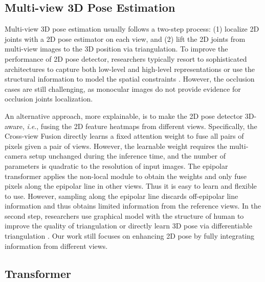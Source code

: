 \documentclass{bmvc2k}
\newcommand{\ie}{\textit{i}.\textit{e}., }
\begin{document}
\subsection{Multi-view 3D Pose Estimation}
\vspace{-0.6em}
Multi-view 3D pose estimation usually follows a two-step process: (1) localize 2D joints with a 2D pose estimator on each view, and (2) lift the 2D joints from multi-view images to the 3D position via triangulation. 
To improve the performance of 2D pose detector, researchers typically resort to sophisticated architectures to capture both low-level and high-level representations  \cite{wei2016convolutional, chen2018cascaded, newell2016stacked, xiao2018simple, sun2019deep} or use the structural information to model the spatial constraints \cite{tompson2014joint, kong2019adaptive, kong2020rotation, kong2020sia, chen2020nonparametric}. However, the occlusion cases are still challenging, as monocular images do not provide evidence for occlusion joints localization. 


An alternative approach, more explainable, is to make the 2D pose detector 3D-aware, \ie fusing the 2D feature heatmaps \cite{qiu2019cross, zhang2021adafuse, xie2020metafuse, chen2021mvhm, he2020epipolar} from different views. 
Specifically, the Cross-view Fusion \cite{qiu2019cross} directly learns a fixed attention weight to fuse all pairs of pixels given a pair of views. However, the learnable weight requires the multi-camera setup unchanged during the inference time, and the number of parameters is quadratic to the resolution of input images. 
The epipolar transformer \cite{he2020epipolar} applies the non-local module \cite{wang2018non} to obtain the weights and only fuse pixels along the epipolar line in other views. Thus it is easy to learn and flexible to use. 
However, sampling along the epipolar line discards off-epipolar line information and thus obtains limited information from the reference views.
In the second step, researchers use graphical model with the structure of human \cite{qiu2019cross} to improve the quality of triangulation or directly learn 3D pose via differentiable triangulation \cite{iskakov2019learnable}. 
Our work still focuses on enhancing 2D pose by fully integrating information from different views. 


\vspace{-1.0em}
\subsection{Transformer}
\vspace{-0.5em}
\end{document}

